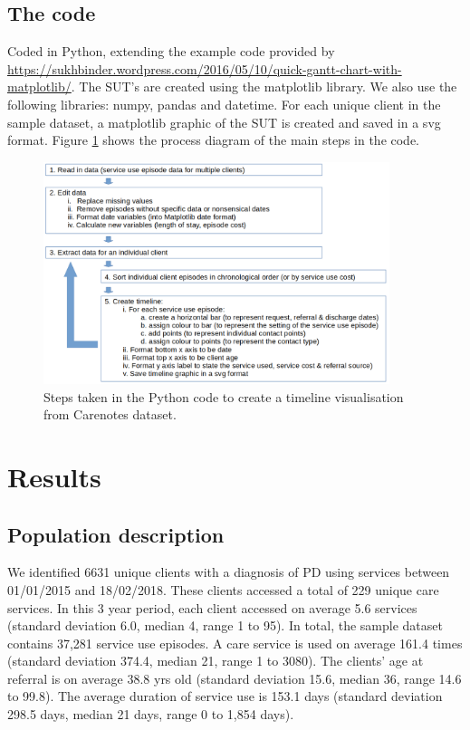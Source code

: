 \documentclass{article}
\begin{document}
\subsection{The code}
Coded in Python, extending the example code provided by \url{https://sukhbinder.wordpress.com/2016/05/10/quick-gantt-chart-with-matplotlib/}.
The SUT’s are created using the matplotlib library. We also use the following libraries: numpy, pandas and datetime. For each unique client in the sample dataset, a matplotlib graphic of the SUT is created and saved in a svg format. Figure \ref{fig:process_diagram} shows the process diagram of the main steps in the code.

\begin{figure}[!h]
	\centering
	\includegraphics[width=0.9\textwidth]{images/process_diagram.png}
	\caption{Steps taken in the Python code to create a timeline visualisation from Carenotes dataset.}
	\label{fig:process_diagram}
\end{figure}

\section{Results}

\subsection{Population description}
We identified 6631 unique clients with a diagnosis of PD using services between 01/01/2015 and 18/02/2018. These clients accessed a total of 229 unique care services. In this 3 year period, each client accessed on average 5.6 services (standard deviation 6.0, median 4, range 1 to 95). In total, the sample dataset contains 37,281 service use episodes. A care service is used on average 161.4 times (standard deviation 374.4, median 21, range 1 to 3080). The clients’ age at referral is on average 38.8 yrs old (standard deviation 15.6, median 36, range 14.6 to 99.8). The average duration of service use is 153.1 days (standard deviation 298.5 days, median 21 days, range 0 to 1,854 days).
\end{document}
